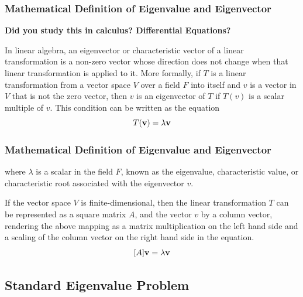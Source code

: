 \documentclass[fleqn]{beamer} %
\newcommand{\sectionIsubsectionItitle}{Mathematical Definition of Eigenvalue and Eigenvector}
\newcommand{\sectionIsubsectionIItitle}{Standard Eigenvalue Problem}
\begin{document}
			\begin{frame}
				\frametitle{\sectionIsubsectionItitle}
				\bigskip

				\textbf{Did you study this in calculus? Differential Equations?} \vspace{3mm}

				In linear algebra, an eigenvector or characteristic vector of a linear transformation is a non-zero vector whose direction does not change when that linear transformation is applied to it. More formally, if $T$ is a linear transformation from a vector space $V$ over a field $F$ into itself and $v$ is a vector in $V$ that is not the zero vector, then $v$ is an eigenvector of $T$ if $T(v)$ is a scalar multiple of $v$. This condition can be written as the equation\\

				\[ T({\bf v})=\lambda{\bf v} \]


				\btVFill
			\end{frame}

			\begin{frame}
				\frametitle{\sectionIsubsectionItitle}
				\bigskip

				where $\lambda$ is a scalar in the field $F$, known as the eigenvalue, characteristic value, or characteristic root associated with the eigenvector $v$.

				If the vector space $V$ is finite-dimensional, then the linear transformation $T$ can be represented as a square matrix $A$, and the vector $v$ by a column vector, rendering the above mapping as a matrix multiplication on the left hand side and a scaling of the column vector on the right hand side in the equation.\\

				\[ [A]{\bf v}=\lambda{\bf v} \]

				\btVFill
			\end{frame}

		\subsection{\sectionIsubsectionIItitle}\label{sectionIsubsectionII}
\end{document}
